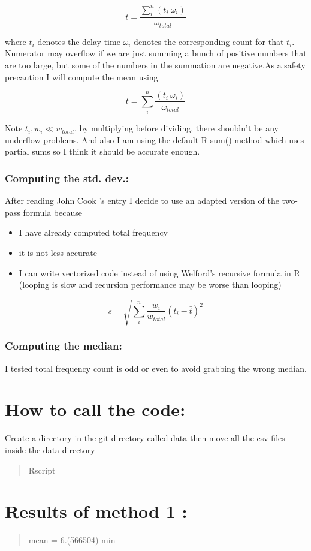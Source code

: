 \documentclass[letterpaper,10pt,english]{/usr/local/lib/python2.7/dist-packages/sphinx/texinputs/sphinxhowto}
\begin{document}
\[ \bar{t} = \frac{ \sum_i^n (t_i ~\omega_i)}{\omega_{total}}\]

where $t_i$ denotes the delay time $\omega_i$ denotes the corresponding
count for that $t_i$. Numerator may overflow if we are just summing a
bunch of positive numbers that are too large, but some of the numbers in
the summation are negative.As a safety precaution I will compute the mean using

\[ \bar{t} =  \sum_i^n \frac{(t_i ~\omega_i)}{\omega_{total}}\]

Note $t_i, w_i \ll w_{total}$, by multiplying before dividing, there
shouldn't be any underflow problems. And also I am using the default R
sum() method which uses partial sums so I think it should be accurate
enough.\subsubsection{Computing the std. dev.:}After reading John Cook 's entry I decide to use an adapted version of
the two-pass formula because

\begin{itemize}
\itemsep1pt\parskip0pt
\item
  I have already computed total frequency
\item
  it is not less accurate
\item
  I can write vectorized code instead of using Welford's recursive
  formula in R (looping is slow and recursion performance may be worse
  than looping)
\end{itemize}

\[s = \sqrt{\sum_i^n \frac{w_i}{w_{total}}(t_i - \bar{t})^2} \]\subsubsection{Computing the median:}I tested total frequency count is odd or even to avoid grabbing the
wrong median.\section{How to call the code:}Create a directory in the git directory called data then move all the
csv files inside the data directory\begin{quote}
Rscript
\end{quote}\section{Results of method 1 :}\begin{quote}
mean = 6.(566504) min
\end{quote}
\end{document}
